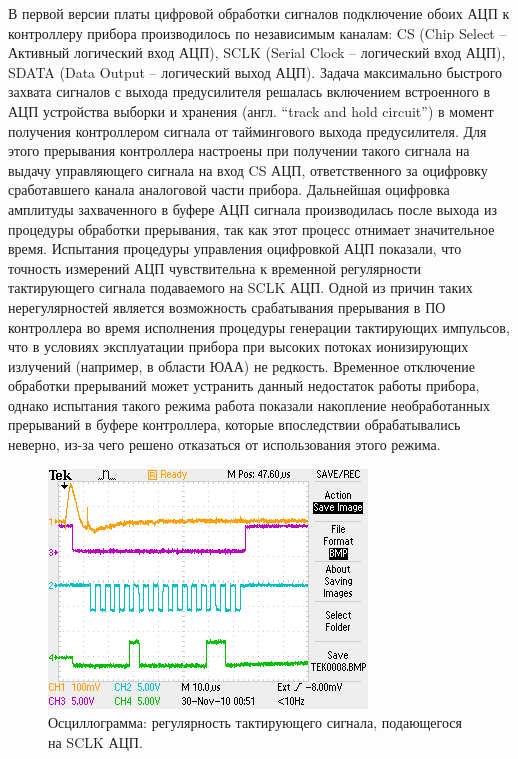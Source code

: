 В первой версии платы цифровой обработки сигналов подключение обоих АЦП к контроллеру прибора производилось по независимым каналам: CS (Chip Select -- Активный логический вход АЦП), SCLK (Serial Clock -- логический вход АЦП), SDATA (Data Output -- логический выход АЦП). Задача максимально быстрого захвата сигналов с выхода предусилителя решалась включением встроенного в АЦП устройства выборки и хранения (англ. ``track and hold circuit'') в момент получения контроллером сигнала от таймингового выхода предусилителя. Для этого прерывания контроллера настроены при получении такого сигнала на выдачу управляющего сигнала на вход CS АЦП, ответственного за оцифровку сработавшего канала аналоговой части прибора. Дальнейшая оцифровка амплитуды захваченного в буфере АЦП сигнала производилась после выхода из процедуры обработки прерывания, так как этот процесс отнимает значительное время. Испытания процедуры управления оцифровкой АЦП показали, что точность измерений АЦП чувствительна к временной регулярности тактирующего сигнала подаваемого на SCLK АЦП. Одной из причин таких нерегулярностей является возможность срабатывания прерывания в ПО контроллера во время исполнения процедуры генерации тактирующих импульсов, что в условиях эксплуатации прибора при высоких потоках ионизирующих излучений (например, в области ЮАА) не редкость. Временное отключение обработки прерываний может устранить данный недостаток работы прибора, однако испытания такого режима работа показали накопление необработанных прерываний в буфере контроллера, которые впоследствии обрабатывались неверно, из-за чего решено отказаться от использования этого режима.

\begin{figure}
\centering
\includegraphics[width=0.7\linewidth]{images/TEK0008}
\caption{Осциллограмма: регулярность тактирующего сигнала, подающегося на SCLK АЦП.}
\label{fig:oscadc}
\end{figure}


